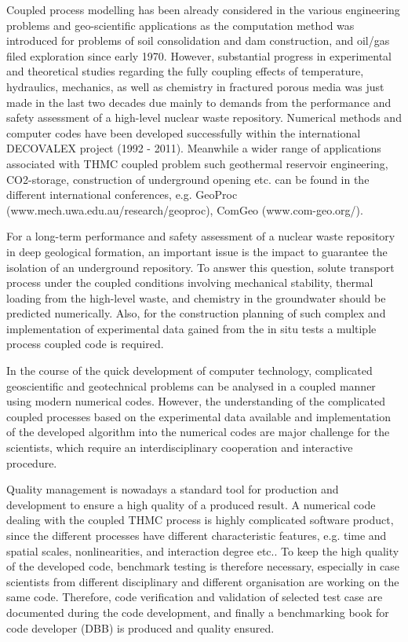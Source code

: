 
Coupled process modelling has been already considered in the various engineering problems and geo-scientific applications as the computation method was introduced for problems of soil consolidation and dam construction, and oil/gas filed exploration since early 1970. However, substantial progress in experimental and theoretical studies regarding the fully coupling effects of temperature, hydraulics, mechanics, as well as chemistry in fractured porous media was just made in the last two decades due mainly to demands from the performance and safety assessment of a high-level nuclear waste repository. Numerical methods and computer codes have been developed successfully within the international DECOVALEX project (1992 - 2011). Meanwhile a wider range of applications associated with THMC coupled problem such geothermal reservoir engineering, CO2-storage, construction of underground opening etc. can be found in the different international conferences, e.g. GeoProc (www.mech.uwa.edu.au/research/geoproc), ComGeo (www.com-geo.org/).

For a long-term performance and safety assessment of a nuclear waste repository in deep geological formation, an important issue is the impact to guarantee the isolation of an underground repository. To answer this question, solute transport process under the coupled conditions involving mechanical stability, thermal loading from the high-level waste, and chemistry in the groundwater should be predicted numerically. Also, for the construction planning of such complex and implementation of experimental data gained from the in situ tests a multiple process coupled code is required. 

In the course of the quick development of computer technology, complicated geoscientific and geotechnical problems can be analysed in a coupled manner using modern numerical codes.
However, the understanding of the complicated coupled processes based on the experimental data available and implementation of the developed algorithm into the numerical codes are major challenge for the scientists, which require an interdisciplinary cooperation and interactive procedure. 

Quality management is nowadays a standard tool for production and development to ensure a high quality of a produced result. A numerical code dealing with the coupled THMC process is highly complicated software product, since the different processes have different characteristic features, e.g. time and spatial scales, nonlinearities, and interaction degree etc.. To keep the high quality of the developed code, benchmark testing is therefore necessary, especially in case scientists from different disciplinary and different organisation are working on the same code. Therefore, code verification and validation of selected test case are documented during the code development, and finally a benchmarking book for code developer (DBB) is produced and quality ensured.
